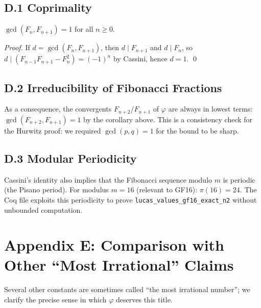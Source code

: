 \subsection{D.1 Coprimality}
\label{subsec:gc-coprime}

\begin{corollary}
$\gcd(F_n, F_{n+1}) = 1$ for all $n \geq 0$.
\end{corollary}

\begin{proof}
If $d = \gcd(F_n, F_{n+1})$, then $d \mid F_{n+1}$
and $d \mid F_n$, so $d \mid (F_{n-1}F_{n+1} - F_n^2)
= (-1)^n$ by Cassini, hence $d = 1$.
\qed
\end{proof}

\subsection{D.2 Irreducibility of Fibonacci Fractions}
\label{subsec:gc-irred}

As a consequence, the convergents $F_{n+2}/F_{n+1}$
of $\varphi$ are always in lowest terms:
$\gcd(F_{n+2}, F_{n+1}) = 1$ by the corollary above.
This is a consistency check for the Hurwitz proof:
we required $\gcd(p,q) = 1$ for the bound to be sharp.

\subsection{D.3 Modular Periodicity}
\label{subsec:gc-pisano}

Cassini's identity also implies that the Fibonacci
sequence modulo $m$ is periodic (the Pisano period).
For modulus $m = 16$ (relevant to GF16):
$\pi(16) = 24$.
The Coq file
exploits this periodicity to prove
\texttt{lucas\_values\_gf16\_exact\_n2}
without unbounded computation.

\section{Appendix E: Comparison with Other
``Most Irrational'' Claims}
\label{sec:gc-appendix-claims}

Several other constants are sometimes called ``the
most irrational number''; we clarify the precise
sense in which $\varphi$ deserves this title.

